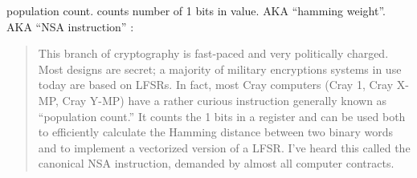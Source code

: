 ﻿
  \item[POPCNT] population count. 
  {counts number of 1 bits in value}.
  \ac{AKA} ``hamming weight''.
  \ac{AKA} ``NSA instruction'' :

\begin{framed}
\begin{quotation}
  This branch of cryptography is fast-paced and very politically charged.
  Most designs are secret; a majority of military encryptions systems in use today are 
  based on LFSRs. 
  In fact, most Cray computers (Cray 1, Cray X-MP, Cray Y-MP) have a rather curious 
  instruction generally known as “population count.” It counts the 1 bits in a register 
  and can be used both to efficiently calculate the Hamming distance between two binary 
  words and to implement a vectorized version of a LFSR. I’ve heard this called the canonical 
  NSA instruction, demanded by almost all computer contracts.
\end{quotation}
\end{framed}
\cite{Schneier}

